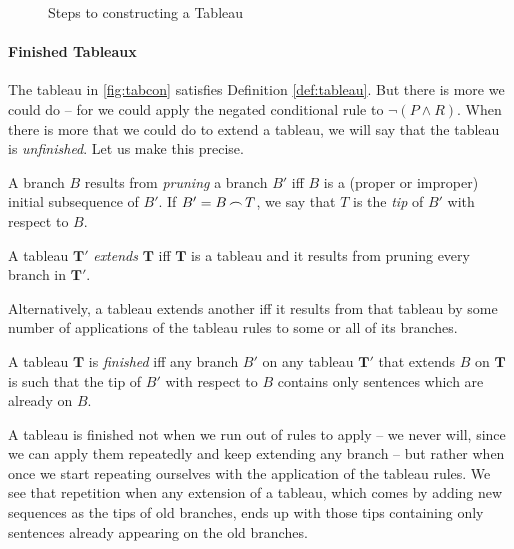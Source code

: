 \begin{figure}
    \centering
{}\qquad
{}\qquad
{}
  \caption{Steps to constructing a Tableau \label{fig:tabcon}}
\end{figure}

\paragraph{Finished Tableaux} The tableau in \autoref{fig:tabcon} satisfies Definition \ref{def:tableau}. But there is more we could do – for we could apply the negated conditional rule to $¬(P \wedge R)$. When there is more that we could do to extend a tableau, we will say that the tableau is \emph{unfinished}. Let us make this precise. \begin{definition}
	A branch $B$ results from \emph{pruning} a branch $B'$ iff $B$ is a (proper or improper) initial subsequence of $B'$. If $B' = B \mathop{\frown} T$, we say that $T$ is the \emph{tip} of $B'$ with respect to $B$.
\end{definition}
\begin{definition}[Extends]
	A tableau $\mathbf{T}'$ \emph{extends} $\mathbf{T}$ iff $\mathbf{T}$ is a tableau and it results from pruning every branch in $\mathbf{T}'$.
\end{definition} Alternatively, a tableau extends another iff it results from that tableau by some number of applications of the tableau rules to some or all of its branches.
\begin{definition}[Finished]
	A tableau $\mathbf{T}$ is \emph{finished} iff any branch $B'$ on any tableau $\mathbf{T}'$ that extends $B$ on $\mathbf{T}$ is such that the tip of $B'$ with respect to $B$ contains only sentences which are already on $B$. 
\end{definition} A tableau is finished not when we run out of rules to apply – we never will, since we can apply them repeatedly and keep extending any branch – but rather when once we start repeating ourselves with the application of the tableau rules. We see that repetition when any extension of a tableau, which comes by adding new sequences as the tips of old branches, ends up with those tips containing only sentences already appearing on the old branches.

